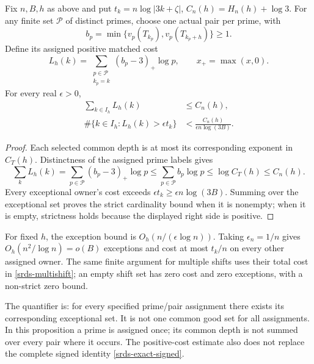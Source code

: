 \begin{proposition}
\label{srds-assigned-markov}
Fix \(n,B,h\) as above and put \(t_k=n\log|3k+\zeta|\),
\(C_n(h)=H_n(h)+\log3\). For any finite set \(\mathcal P\)
of distinct primes, choose one actual pair per prime, with
\[
 b_p=\min\{v_p(T_{k_p}),v_p(T_{k_p+h})\}\ge1.
\]
Define its assigned positive matched cost
\[
 L_h(k)=\sum_{\substack{p\in\mathcal P\\k_p=k}}
                          (b_p-3)_+\log p,
 \qquad x_+=\max(x,0).
\]
For every real \(\epsilon>0\),
\begin{equation}
 \begin{split}
 \sum_{k\in I_h}L_h(k)&\le C_n(h),\\
 \#\{k\in I_h:L_h(k)>\epsilon t_k\}
       &<\frac{C_n(h)}{\epsilon n\log(3B)}.
 \end{split}
 \label{srds-assigned-bound}
\end{equation}
\end{proposition}
\begin{proof}
Each selected common depth is at most its corresponding exponent
in \(C_T(h)\). Distinctness of the assigned prime labels gives
\[
 \sum_k L_h(k)=\sum_{p\in\mathcal P}(b_p-3)_+\log p
    \le\sum_{p\in\mathcal P}b_p\log p
    \le\log C_T(h)\le C_n(h).
\]
Every exceptional owner's cost exceeds
\(\epsilon t_k\ge\epsilon n\log(3B)\). Summing over the
exceptional set proves the strict cardinality bound when it is
nonempty; when it is empty, strictness holds because the displayed
right side is positive.
\end{proof}

For fixed \(h\), the exception bound is
\(O_h(n/(\epsilon\log n))\). Taking \(\epsilon_n=1/n\)
gives \(O_h(n^2/\log n)=o(B)\) exceptions and cost at most
\(t_k/n\) on every other assigned owner. The same finite
argument for multiple shifts uses their total cost in
\eqref{srds-multishift}; an empty shift set has zero cost
and zero exceptions, with a non-strict zero bound.

The quantifier is: for every specified prime/pair assignment
there exists its corresponding exceptional set. It is not
one common good set for all assignments. In this proposition
a prime is assigned once; its common depth is not summed over
every pair where it occurs. The positive-cost estimate also
does not replace the complete signed identity
\eqref{srds-exact-signed}.

